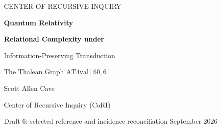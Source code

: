 \documentclass[11pt]{article}
\begin{document}
\thispagestyle{empty}
\begin{center}
{\small\sffamily CENTER OF RECURSIVE INQUIRY}\par
\vspace{10mm}
{\LARGE\bfseries Quantum Relativity\par}
\vspace{2mm}
{\Large\bfseries Relational Complexity under\par Information-Preserving Transduction\par}
\vspace{3mm}
{\large The Thalean Graph \(\mathrm{AT4val}[60,6]\)}\par
\vspace{6mm}
{\large Scott Allen Cave}\par
Center of Recursive Inquiry (CoRI)\par
\vspace{3mm}
Draft 6: selected reference and incidence reconciliation\quad\textbullet{} September 2026
\end{center}
\vspace{4mm}

\clearpage

\clearpage

\clearpage

\clearpage
{}














\setcounter{section}{43}



\clearpage
\appendix
{}


















\clearpage
{}
{}\label{sec:references}
\begingroup\small\raggedright\setlength{\bibsep}{1pt}

\endgroup
\end{document}
